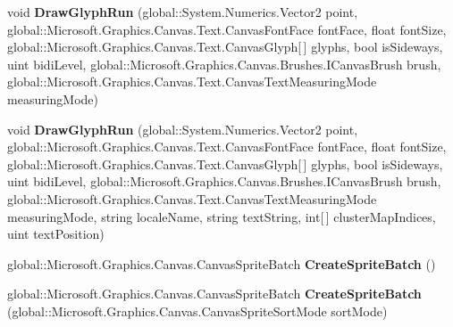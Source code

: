 \begin{DoxyCompactItemize}
\item 
\mbox{\label{interface_microsoft_1_1_graphics_1_1_canvas_1_1_i_canvas_drawing_session_a5f67ddb4076cee52f0ce105ac7ff3625}} 
void {\bfseries Draw\+Glyph\+Run} (global\+::\+System.\+Numerics.\+Vector2 point, global\+::\+Microsoft.\+Graphics.\+Canvas.\+Text.\+Canvas\+Font\+Face font\+Face, float font\+Size, global\+::\+Microsoft.\+Graphics.\+Canvas.\+Text.\+Canvas\+Glyph\mbox{[}$\,$\mbox{]} glyphs, bool is\+Sideways, uint bidi\+Level, global\+::\+Microsoft.\+Graphics.\+Canvas.\+Brushes.\+I\+Canvas\+Brush brush, global\+::\+Microsoft.\+Graphics.\+Canvas.\+Text.\+Canvas\+Text\+Measuring\+Mode measuring\+Mode)
\item 
\mbox{\label{interface_microsoft_1_1_graphics_1_1_canvas_1_1_i_canvas_drawing_session_ac04900ea603ac69768008def334d75c1}} 
void {\bfseries Draw\+Glyph\+Run} (global\+::\+System.\+Numerics.\+Vector2 point, global\+::\+Microsoft.\+Graphics.\+Canvas.\+Text.\+Canvas\+Font\+Face font\+Face, float font\+Size, global\+::\+Microsoft.\+Graphics.\+Canvas.\+Text.\+Canvas\+Glyph\mbox{[}$\,$\mbox{]} glyphs, bool is\+Sideways, uint bidi\+Level, global\+::\+Microsoft.\+Graphics.\+Canvas.\+Brushes.\+I\+Canvas\+Brush brush, global\+::\+Microsoft.\+Graphics.\+Canvas.\+Text.\+Canvas\+Text\+Measuring\+Mode measuring\+Mode, string locale\+Name, string text\+String, int\mbox{[}$\,$\mbox{]} cluster\+Map\+Indices, uint text\+Position)
\item 
\mbox{\label{interface_microsoft_1_1_graphics_1_1_canvas_1_1_i_canvas_drawing_session_ad594f5c3e77fa4d10f3ced9f28ef0b38}} 
global\+::\+Microsoft.\+Graphics.\+Canvas.\+Canvas\+Sprite\+Batch {\bfseries Create\+Sprite\+Batch} ()
\item 
\mbox{\label{interface_microsoft_1_1_graphics_1_1_canvas_1_1_i_canvas_drawing_session_adcd51e0a74eb1bd66142add48476976f}} 
global\+::\+Microsoft.\+Graphics.\+Canvas.\+Canvas\+Sprite\+Batch {\bfseries Create\+Sprite\+Batch} (global\+::\+Microsoft.\+Graphics.\+Canvas.\+Canvas\+Sprite\+Sort\+Mode sort\+Mode)
\item 
\mbox{\label{interface_microsoft_1_1_graphics_1_1_canvas_1_1_i_canvas_drawing_session_af90605df2ad07e7bbaed6f4357cee130}} 

\end{DoxyCompactItemize}
